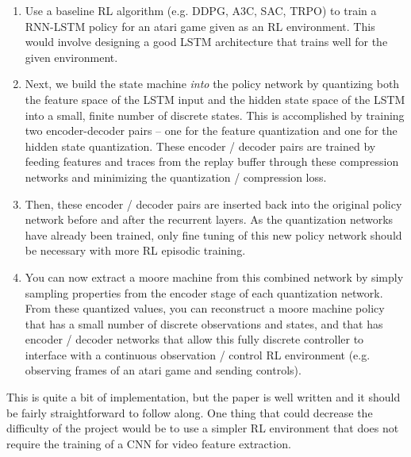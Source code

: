 \begin{enumerate}
    \item Use a baseline RL algorithm (e.g. DDPG, A3C, SAC, TRPO) to train a RNN-LSTM policy for an atari game given as an RL environment. This would involve designing a good LSTM architecture that trains well for the given environment.
    
    \item Next, we build the state machine \textit{into} the policy network by quantizing both the feature space of the LSTM input and the hidden state space of the LSTM into a small, finite number of discrete states. This is accomplished by training two encoder-decoder pairs -- one for the feature quantization and one for the hidden state quantization. These encoder / decoder pairs are trained by feeding features and traces from the replay buffer through these compression networks and minimizing the quantization / compression loss.
    
    \item Then, these encoder / decoder pairs are inserted back into the original policy network before and after the recurrent layers. As the quantization networks have already been trained, only fine tuning of this new policy network should be necessary with more RL episodic training.
    
    \item You can now extract a moore machine from this combined network by simply sampling properties from the encoder stage of each quantization network. From these quantized values, you can reconstruct a moore machine policy that has a small number of discrete observations and states, and that has encoder / decoder networks that allow this fully discrete controller to interface with a continuous observation / control RL environment (e.g. observing frames of an atari game and sending controls).
\end{enumerate}

This is quite a bit of implementation, but the paper is well written and it should be fairly straightforward to follow along. One thing that could decrease the difficulty of the project would be to use a simpler RL environment that does not require the training of a CNN for video feature extraction.

